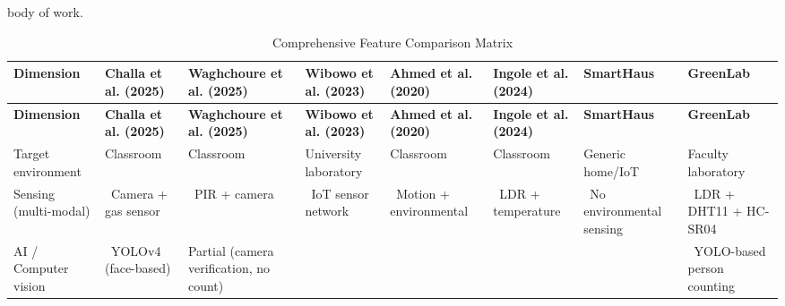 body of work.

	{\small
		\begin{longtable}{|L{2.0cm}|L{1.5cm}|L{1.6cm}|L{1.6cm}|L{1.5cm}|L{1.5cm}|L{1.4cm}|L{1.7cm}|}
			\caption{Comprehensive Feature Comparison Matrix} \label{tab:2-1}                                                                                                                                                                                                                                                                          \\
			\hline
			\textbf{Dimension}                     & \textbf{Challa et al. (2025)}   & \textbf{Waghchoure et al. (2025)}       & \textbf{Wibowo et al. (2023)}      & \textbf{Ahmed et al. (2020)}            & \textbf{Ingole et al. (2024)}           & \textbf{SmartHaus}                  & \textbf{GreenLab}                                      \\
			\hline
			\endfirsthead
			\hline
			\textbf{Dimension}                     & \textbf{Challa et al. (2025)}   & \textbf{Waghchoure et al. (2025)}       & \textbf{Wibowo et al. (2023)}      & \textbf{Ahmed et al. (2020)}            & \textbf{Ingole et al. (2024)}           & \textbf{SmartHaus}                  & \textbf{GreenLab}                                      \\
			\hline
			\endhead
			\hline
			\endfoot
			\hline
			\endlastfoot
			Target environment                     & Classroom                       & Classroom                               & University laboratory              & Classroom                               & Classroom                               & Generic home/IoT                    & Faculty laboratory                                     \\
			\hline
			Sensing (multi-modal)                  & \checkmark\ Camera + gas sensor & \checkmark\ PIR + camera                & \checkmark\ IoT sensor network     & \checkmark\ Motion + environmental      & \checkmark\ LDR + temperature           & \ No environmental sensing & \checkmark\ LDR + DHT11 + HC-SR04                      \\
			\hline
			AI / Computer vision                   & \checkmark\ YOLOv4 (face-based) & Partial (camera verification, no count) &                           &                                &                                &                            & \checkmark\ YOLO-based person counting                 \\

\end{longtable}}
